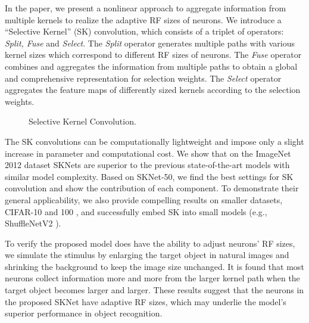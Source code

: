 \documentclass[10pt,twocolumn,letterpaper]{article}
\begin{document}
	
	In the paper, we present a nonlinear approach to aggregate information from multiple kernels to realize the adaptive RF sizes of neurons. We introduce a ``Selective Kernel'' (SK) convolution, which consists of a triplet of operators: \emph{Split, Fuse} and \emph{Select}. The \emph{Split} operator generates multiple paths with various kernel sizes which correspond to different RF sizes of neurons. The \emph{Fuse} operator combines and aggregates the information from multiple paths to obtain a global and comprehensive representation for selection weights. The \emph{Select} operator aggregates the feature maps of differently sized kernels according to the selection weights. 
	
	
	\begin{figure*}[t]
		\begin{center}
			\setlength{\fboxrule}{0pt}
		\end{center}
		\vspace{-8pt}
		\caption{Selective Kernel Convolution.}	
		\label{fig_SK_cropped}
		\vspace{-9pt}
	\end{figure*}
	
	
	The SK convolutions can be computationally lightweight and impose only a slight increase in parameter and computational cost. We show that  on the ImageNet 2012 dataset  \cite{russakovsky2015imagenet} SKNets are superior to the previous state-of-the-art models with similar model complexity. Based on SKNet-50, we find the best settings for SK convolution and show the contribution of each component. To demonstrate their general applicability, we also provide compelling results on smaller datasets, CIFAR-10 and 100 \cite{krizhevsky2009learning}, and successfully embed SK into small models (e.g., ShuffleNetV2 \cite{ma2018shufflenet}).
	
	To verify the proposed model does have the ability to adjust neurons' RF sizes, we simulate the stimulus by enlarging the target object in natural images and shrinking the background to keep the image size unchanged. It is found that most neurons collect information more and more from the larger kernel path when the target object becomes larger and larger. These results suggest that the neurons in the proposed SKNet have adaptive RF sizes, which may underlie the model's superior performance in object recognition.
	
\end{document}
